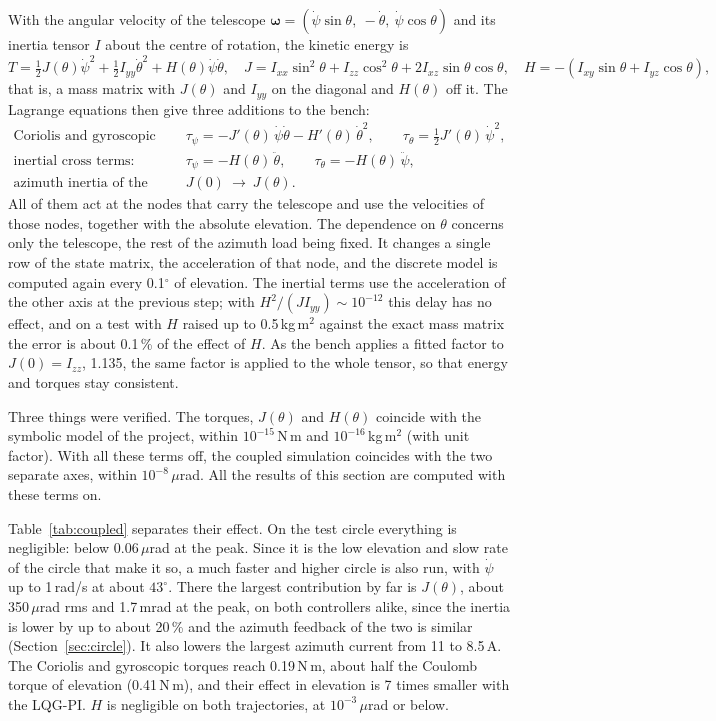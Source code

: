 \documentclass[10pt,a4paper]{article}
\numberwithin{equation}{section}
\begin{document}
With the angular velocity of the telescope $\bm\omega=(\dot\psi\sin\theta,\ -\dot\theta,\ \dot\psi\cos\theta)$ and its inertia tensor $I$ about the centre of rotation, the kinetic energy is
\begin{equation}
T=\tfrac12J(\theta)\dot\psi^2+\tfrac12I_{yy}\dot\theta^2+H(\theta)\dot\psi\dot\theta,\quad J=I_{xx}\sin^2\theta+I_{zz}\cos^2\theta+2I_{xz}\sin\theta\cos\theta,\quad H=-(I_{xy}\sin\theta+I_{yz}\cos\theta),
\end{equation}
that is, a mass matrix with $J(\theta)$ and $I_{yy}$ on the diagonal and $H(\theta)$ off it. The Lagrange equations then give three additions to the bench:
\begin{align}
\text{Coriolis and gyroscopic torques:}\quad&\tau_\psi=-J'(\theta)\,\dot\psi\dot\theta-H'(\theta)\,\dot\theta^2,\qquad\tau_\theta=\tfrac12J'(\theta)\,\dot\psi^2,\\
\text{inertial cross terms:}\quad&\tau_\psi=-H(\theta)\,\ddot\theta,\qquad\tau_\theta=-H(\theta)\,\ddot\psi,\\
\text{azimuth inertia of the telescope:}\quad&J(0)\ \longrightarrow\ J(\theta).
\end{align}
All of them act at the nodes that carry the telescope and use the velocities of those nodes, together with the absolute elevation. The dependence on $\theta$ concerns only the telescope, the rest of the azimuth load being fixed. It changes a single row of the state matrix, the acceleration of that node, and the discrete model is computed again every 0.1$^\circ$ of elevation. The inertial terms use the acceleration of the other axis at the previous step; with $H^2/(JI_{yy})\sim10^{-12}$ this delay has no effect, and on a test with $H$ raised up to 0.5\,kg\,m$^2$ against the exact mass matrix the error is about 0.1\,\% of the effect of $H$. As the bench applies a fitted factor to $J(0)=I_{zz}$, 1.135, the same factor is applied to the whole tensor, so that energy and torques stay consistent.

Three things were verified. The torques, $J(\theta)$ and $H(\theta)$ coincide with the symbolic model of the project, within $10^{-15}$\,N\,m and $10^{-16}$\,kg\,m$^2$ (with unit factor). With all these terms off, the coupled simulation coincides with the two separate axes, within $10^{-8}$\,$\mu$rad. All the results of this section are computed with these terms on.

Table~\ref{tab:coupled} separates their effect. On the test circle everything is negligible: below $0.06\,\mu$rad at the peak. Since it is the low elevation and slow rate of the circle that make it so, a much faster and higher circle is also run, with $\dot\psi$ up to 1\,rad/s at about $43^\circ$. There the largest contribution by far is $J(\theta)$, about 350\,$\mu$rad rms and 1.7\,mrad at the peak, on both controllers alike, since the inertia is lower by up to about 20\,\% and the azimuth feedback of the two is similar (Section~\ref{sec:circle}). It also lowers the largest azimuth current from 11 to 8.5\,A. The Coriolis and gyroscopic torques reach 0.19\,N\,m, about half the Coulomb torque of elevation (0.41\,N\,m), and their effect in elevation is 7 times smaller with the LQG-PI. $H$ is negligible on both trajectories, at $10^{-3}\,\mu$rad or below.
\end{document}
